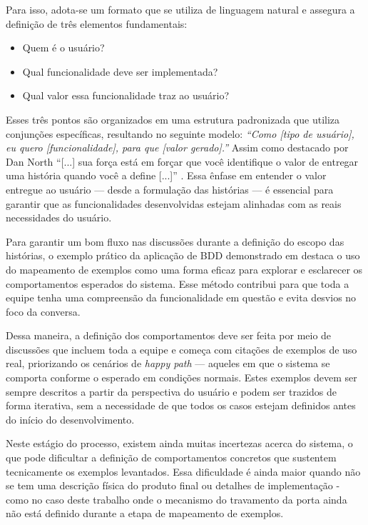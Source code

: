 Para isso, adota-se um formato que se utiliza de linguagem natural e assegura a definição de três elementos fundamentais:

\begin{itemize}
	\item Quem é o usuário?
	\item Qual funcionalidade deve ser implementada?
	\item Qual valor essa funcionalidade traz ao usuário?
\end{itemize}

Esses três pontos são organizados em uma estrutura padronizada que utiliza conjunções específicas, resultando no seguinte modelo:
\textit{“Como [tipo de usuário], eu quero [funcionalidade], para que [valor gerado].”}
Assim como destacado por Dan North ``[...] sua força está em forçar que você identifique o valor de entregar uma história quando você a define [...]'' 
\cite{north2006bdd}. Essa ênfase em entender o valor entregue ao usuário — desde a formulação das histórias — é essencial para garantir que as funcionalidades desenvolvidas estejam 
alinhadas com as reais necessidades do usuário.

Para garantir um bom fluxo nas discussões durante a definição do escopo das histórias, o exemplo prático da aplicação de BDD demonstrado em  
destaca o uso do mapeamento de exemplos como uma forma eficaz para explorar e esclarecer os comportamentos esperados do sistema. Esse método contribui para que 
toda a equipe tenha uma compreensão da funcionalidade em questão e evita desvios no foco da conversa.

Dessa maneira, a definição dos comportamentos deve ser feita por meio de discussões que incluem toda a equipe e começa com citações de exemplos de uso real, priorizando 
os cenários de \textit{happy path} — aqueles em que o sistema se comporta conforme o esperado em condições normais. Estes exemplos devem ser sempre descritos a partir da 
perspectiva do usuário e podem ser trazidos de forma iterativa, sem a necessidade de que todos os casos estejam definidos antes do início do desenvolvimento.

Neste estágio do processo, existem ainda muitas incertezas acerca do sistema, o que pode dificultar a definição de comportamentos concretos que sustentem 
tecnicamente os exemplos levantados. Essa dificuldade é ainda maior quando não se tem uma descrição física do produto final ou detalhes de implementação - como no 
caso deste trabalho onde o mecanismo do travamento da porta ainda não está definido durante a etapa de mapeamento de exemplos.

